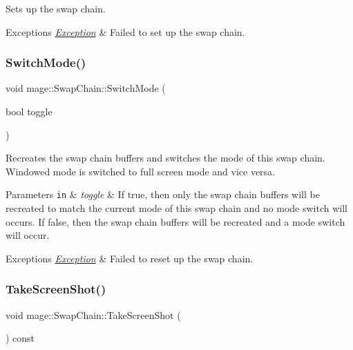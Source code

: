 Sets up the swap chain.


\begin{DoxyExceptions}{Exceptions}
{\em \hyperlink{classmage_1_1_exception}{Exception}} & Failed to set up the swap chain. \\
\hline
\end{DoxyExceptions}
\hypertarget{classmage_1_1_swap_chain_ada1b8857eeac3d00287fb624645e365e}{}\label{classmage_1_1_swap_chain_ada1b8857eeac3d00287fb624645e365e} 
\subsubsection{\texorpdfstring{Switch\+Mode()}{SwitchMode()}}
{\footnotesize\ttfamily void mage\+::\+Swap\+Chain\+::\+Switch\+Mode (\begin{DoxyParamCaption}\item[{bool}]{toggle }\end{DoxyParamCaption})}

Recreates the swap chain buffers and switches the mode of this swap chain. Windowed mode is switched to full screen mode and vice versa.


\begin{DoxyParams}[1]{Parameters}
\mbox{\tt in}  & {\em toggle} & If {\ttfamily true}, then only the swap chain buffers will be recreated to match the current mode of this swap chain and no mode switch will occurs. If {\ttfamily false}, then the swap chain buffers will be recreated and a mode switch will occur. \\
\hline
\end{DoxyParams}

\begin{DoxyExceptions}{Exceptions}
{\em \hyperlink{classmage_1_1_exception}{Exception}} & Failed to reset up the swap chain. \\
\hline
\end{DoxyExceptions}
\hypertarget{classmage_1_1_swap_chain_a23a4618b5104203c5a5c962696ae3b53}{}\label{classmage_1_1_swap_chain_a23a4618b5104203c5a5c962696ae3b53} 
\subsubsection{\texorpdfstring{Take\+Screen\+Shot()}{TakeScreenShot()}}
{\footnotesize\ttfamily void mage\+::\+Swap\+Chain\+::\+Take\+Screen\+Shot (\begin{DoxyParamCaption}{ }\end{DoxyParamCaption}) const}

